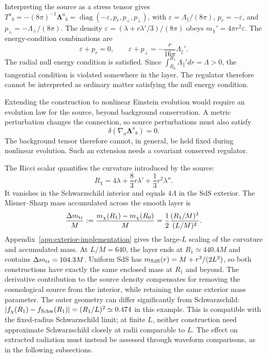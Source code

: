 \documentclass[
 aps,
 prd,
 reprint,
 superscriptaddress,
 nofootinbib,
 longbibliography
]{revtex4-2}
\begin{document}
Interpreting the source as a stress tensor gives
$T^a{}_b=-(8\pi)^{-1}\boldsymbol{\Lambda}^a{}_b
=\operatorname{diag}(-\varepsilon,p_r,p_\perp,p_\perp)$, with
$\varepsilon=\Lambda_{\parallel}/(8\pi)$,
$p_r=-\varepsilon$, and $p_\perp=-\Lambda_{\perp}/(8\pi)$.
The density $\varepsilon=(\lambda+r\lambda'/3)/(8\pi)$ obeys
$m_\chi'=4\pi r^2\varepsilon$.  The energy-condition combinations are
\begin{equation}
 \varepsilon+p_r=0,
 \qquad
 \varepsilon+p_\perp=-\frac{r}{16\pi}\Lambda_{\parallel}'.
 \label{eq:exterior_nec}
\end{equation}
The radial null energy condition is satisfied.  Since
$\int_{R_0}^{R_1}\Lambda_{\parallel}'dr=\Lambda>0$, the tangential condition
is violated somewhere in the layer.  The regulator therefore cannot be
interpreted as ordinary matter satisfying the null energy condition.

Extending the construction to nonlinear Einstein evolution would require
an evolution law for the source, beyond background conservation.  A metric
perturbation changes the
connection, so source perturbations must also satisfy
\begin{equation}
 \delta\!\left(\nabla_a\boldsymbol{\Lambda}^a{}_b\right)=0.
 \label{eq:perturbed_conservation}
\end{equation}
The background tensor therefore cannot, in general, be held fixed during
nonlinear evolution.  Such an extension needs a covariant conserved regulator.

The Ricci scalar quantifies the curvature introduced by the source:
\begin{equation}
 R_\chi=4\lambda+\frac{8}{3}r\lambda'
 +\frac{1}{3}r^2\lambda''.
 \label{eq:exterior_ricci_scalar}
\end{equation}
It vanishes in the Schwarzschild interior and equals $4\Lambda$ in the SdS
exterior.  The Misner--Sharp mass accumulated across the smooth layer is
\begin{equation}
 \frac{\Delta m_{\rm tr}}{M}
 :=\frac{m_\chi(R_1)-m_\chi(R_0)}{M}
 =\frac12\frac{(R_1/M)^3}{(L/M)^2}.
 \label{eq:transition_mass}
\end{equation}
Appendix~\ref{app:exterior-implementation} gives the large-$L$ scaling of
the curvature and accumulated mass.
At $L/M=640$, the layer ends at $R_1\simeq440.4M$ and contains
$\Delta m_{\rm tr}=104.3M$.  Uniform SdS has
$m_{\rm SdS}(r)=M+r^3/(2L^2)$, so both constructions have exactly the same
enclosed mass at $R_1$ and beyond.  The derivative contribution to the
source density compensates for removing the cosmological source from the
interior, while retaining the same exterior mass parameter.  
The outer geometry can differ significantly from Schwarzschild:
$|f_\chi(R_1)-f_{\rm Schw}(R_1)|=(R_1/L)^2\simeq0.474$ in this example.
This is compatible with the fixed-radius Schwarzschild limit; at finite
$L$, neither construction need approximate Schwarzschild closely at radii
comparable to $L$.  The effect on extracted radiation must instead be
assessed through waveform comparisons, as in the following subsections.
\end{document}
